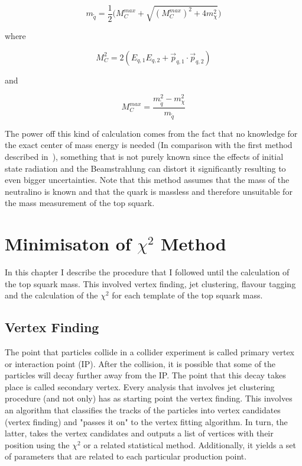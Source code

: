 \documentclass[12pt,a4paper]{report}
\begin{document}
\begin{equation}
 m_{\tilde{q}}=\frac{1}{2} \big(M_{C}^{max} + \sqrt{(M_{C}^{max})^{2} + 4m_{\chi}^{2}} \big)
\end{equation}

where 

\begin{equation}
 M_{C}^{2}=2(E_{q,1}E_{q,2}+\vec{p}_{q,1}\cdot \vec{p}_{q,2})
\end{equation}

and

\begin{equation}
 M_{C}^{max}=\frac{m^{2}_{\tilde{q}}-m^{2}_{\chi}}{m_{\tilde{q}}}
\end{equation}

The power off this kind of calculation comes from the fact that no knowledge for the exact center of mass 
energy is needed (In comparison with the first method described in~\cite{simon2010techniques}), something that is not purely known since the effects of initial state radiation and
the Beamstrahlung can distort it significantly resulting to even bigger uncertainties. Note that this method 
assumes that the mass of the neutralino is known and that the quark is massless and therefore
unsuitable for the mass measurement of the top squark. 

\section{Minimisaton of $\chi^{2}$ Method}

In this chapter I describe the procedure that I followed until the calculation of the top squark mass. 
This involved vertex finding, jet clustering, flavour tagging and the calculation of the $\chi^{2}$
for each template of the top squark mass.

\subsection{Vertex Finding}

The point that particles collide in a collider experiment is called primary vertex or interaction 
point (IP). After the 
collision, it is possible that some of the particles will decay further away from the IP. The point 
that this decay takes place is called secondary vertex. Every analysis that involves jet clustering
procedure (and not only) has as starting point the vertex finding. This involves an algorithm that 
classifies the tracks of the particles into vertex candidates (vertex finding) and "passes it on"
to the vertex fitting  algorithm. In turn, the latter, takes the vertex candidates and outputs a
list of vertices with their position using the $\chi^{2}$ or a related statistical method. 
Additionally, it yields a set of parameters that are related to each particular production point.
\end{document}
